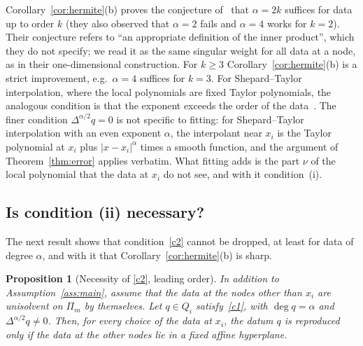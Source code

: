 \documentclass[12pt]{amsart}
\newtheorem{proposition}[theorem]{Proposition}
\theoremstyle{definition}
\theoremstyle{remark}
\newcommand{\Pm}{\Pi_m}
\begin{document}
Corollary~\ref{cor:hermite}(b) proves the conjecture of~\cite[\S3]{KomargodskiLevin2006} that
$\alpha=2k$ suffices for data up to order $k$ (they also observed that $\alpha=2$ fails and
$\alpha=4$ works for $k=2$). Their conjecture refers to ``an appropriate definition of the
inner product'', which they do not specify; we read it as the same singular weight for all data
at a node, as in their one-dimensional construction. For $k\ge3$ Corollary~\ref{cor:hermite}(b) is a strict improvement, e.g.\ $\alpha=4$ suffices
for $k=3$. For Shepard--Taylor interpolation, where the local polynomials are fixed Taylor
polynomials, the analogous condition is that the exponent exceeds the order of the
data~\cite{GordonWixom1978,Farwig1986,Coman1998}. The finer condition $\Delta^{\alpha/2}q=0$ is
not specific to fitting: for Shepard--Taylor interpolation with an even exponent $\alpha$, the
interpolant near $x_i$ is the Taylor polynomial at $x_i$ plus $|x-x_i|^\alpha$ times a smooth
function, and the argument of Theorem~\ref{thm:error} applies verbatim. What fitting adds is the
part $\nu$ of the local polynomial that the data at $x_i$ do not see, and with it
condition~(i).

\subsection{Is condition (ii) necessary?}\label{sec:necessity}
The next result shows that condition~\ref{c2} cannot be dropped, at least for data of degree
$\alpha$, and with it that Corollary~\ref{cor:hermite}(b) is sharp.

\begin{proposition}[Necessity of \ref{c2}, leading order]\label{prop:necessity}
In addition to Assumption~\ref{ass:main}, assume that the data at the nodes other than $x_i$
are unisolvent on $\Pm$ by themselves. Let $q\in Q_i$ satisfy~\ref{c1}, with $\deg q=\alpha$
and $\Delta^{\alpha/2}q\ne0$. Then, for every choice of the data at $x_i$, the datum $q$ is
reproduced only if the data at the other nodes lie in a fixed affine hyperplane.
\end{proposition}
\end{document}
